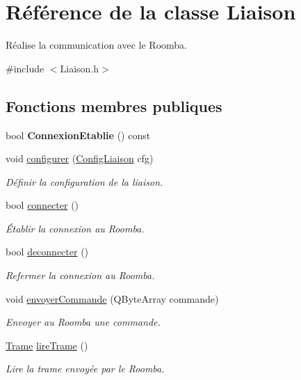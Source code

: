 \hypertarget{class_liaison}{}\section{Référence de la classe Liaison}
\label{class_liaison}


Réalise la communication avec le Roomba.  




{\ttfamily \#include $<$Liaison.\+h$>$}

\subsection*{Fonctions membres publiques}
\begin{DoxyCompactItemize}
\item 
bool {\bfseries Connexion\+Etablie} () const \hypertarget{class_liaison_adf5c86d29003736af1e06adb94c58d65}{}\label{class_liaison_adf5c86d29003736af1e06adb94c58d65}

\item 
void \hyperlink{class_liaison_adbccfcb0fd523be8dc4eb46bfb36f082}{configurer} (\hyperlink{class_config_liaison}{Config\+Liaison} cfg)
\begin{DoxyCompactList}\small\item\em Définir la configuration de la liaison. \end{DoxyCompactList}\item 
bool \hyperlink{class_liaison_ad760074370ae78ba996ccc1c2c85b91d}{connecter} ()
\begin{DoxyCompactList}\small\item\em Établir la connexion au Roomba. \end{DoxyCompactList}\item 
bool \hyperlink{class_liaison_a04b34111e5c80a2f429ac5209e7597b7}{deconnecter} ()
\begin{DoxyCompactList}\small\item\em Refermer la connexion au Roomba. \end{DoxyCompactList}\item 
void \hyperlink{class_liaison_ab1e3ee8df9a7930635950a3a04f1579c}{envoyer\+Commande} (Q\+Byte\+Array commande)
\begin{DoxyCompactList}\small\item\em Envoyer au Roomba une commande. \end{DoxyCompactList}\item 
\hyperlink{class_trame}{Trame} \hyperlink{class_liaison_aac991944c85ac165fcb6c213a2449313}{lire\+Trame} ()
\begin{DoxyCompactList}\small\item\em Lire la trame envoyée par le Roomba. \end{DoxyCompactList}\end{DoxyCompactItemize}
